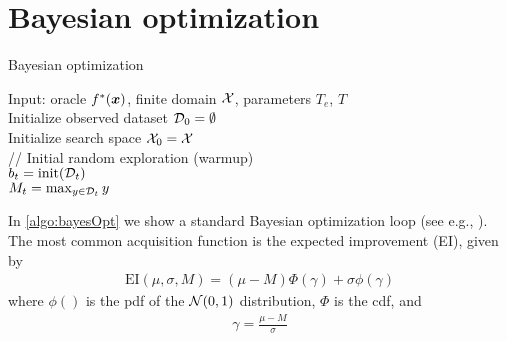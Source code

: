 \section{Bayesian optimization}





\begin{algorithm}
\dontprintsemicolon
\caption{Bayesian optimization}
\label{algo:bayesOpt}
Input: oracle $f^*({\bm{x}})$, finite domain $\mathcal{X}$, 
parameters $T_e$, $T$\\
Initialize observed dataset ${\mathcal{D}}_0 = \emptyset$\\
Initialize search space $\mathcal{X}_0 = \mathcal{X}$\\
// Initial random exploration (warmup) \\
$b_t = \text{init}({\mathcal{D}}_t)$ \\
$M_t = \max_{y \in {\mathcal{D}}_t} y$ \\
\end{algorithm}

In \cref{algo:bayesOpt} we show a standard Bayesian optimization loop
(see e.g., \cite{Garnett2023}).
The most common acquisition function is
 the expected improvement (EI), given by
\begin{align}
\text{EI}(\mu, \sigma, M)
 = (\mu - M) \Phi(\gamma)
 + \sigma \phi(\gamma)
\end{align}
where $\phi()$ is the pdf of the $\mathcal{N}(0,1)$
distribution, $\Phi$ is the cdf, and 
\begin{align}
\gamma = \frac{\mu-M}{\sigma}
\end{align}